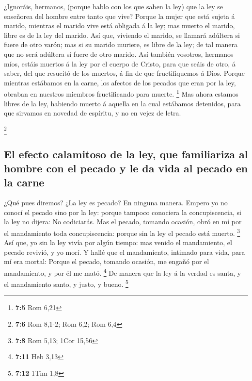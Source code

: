  ¿Ignoráis, hermanos, (porque hablo con los que saben la
ley) que la ley se enseñorea del hombre entre tanto que vive?
 Porque la mujer que está sujeta á marido, mientras el
marido vive está obligada á la ley; mas muerto el marido, libre es de la
ley del marido.  Así que, viviendo el marido, se llamará
adúltera si fuere de otro varón; mas si su marido muriere, es libre de
la ley; de tal manera que no será adúltera si fuere de otro marido.
 Así también vosotros, hermanos míos, estáis muertos á la
ley por el cuerpo de Cristo, para que seáis de otro, á saber, del que
resucitó de los muertos, á fin de que fructifiquemos á Dios.
 Porque mientras estábamos en la carne, los afectos de los
pecados que eran por la ley, obraban en nuestros miembros fructificando
para muerte. \footnote{\textbf{7:5} Rom 6,21}  Mas ahora
estamos libres de la ley, habiendo muerto á aquella en la cual estábamos
detenidos, para que sirvamos en novedad de espíritu, y no en vejez de
letra.

\footnote{\textbf{7:6} Rom 8,1-2; Rom 6,2; Rom 6,4}

\hypertarget{el-efecto-calamitoso-de-la-ley-que-familiariza-al-hombre-con-el-pecado-y-le-da-vida-al-pecado-en-la-carne}{%
\subsection{El efecto calamitoso de la ley, que familiariza al hombre
con el pecado y le da vida al pecado en la
carne}\label{el-efecto-calamitoso-de-la-ley-que-familiariza-al-hombre-con-el-pecado-y-le-da-vida-al-pecado-en-la-carne}}

 ¿Qué pues diremos? ¿La ley es pecado? En ninguna manera.
Empero yo no conocí el pecado sino por la ley: porque tampoco conociera
la concupiscencia, si la ley no dijera: No codiciarás. 
Mas el pecado, tomando ocasión, obró en mí por el mandamiento toda
concupiscencia: porque sin la ley el pecado está muerto. \footnote{\textbf{7:8}
  Rom 5,13; 1Cor 15,56}  Así que, yo sin la ley vivía por
algún tiempo: mas venido el mandamiento, el pecado revivió, y yo morí.
 Y hallé que el mandamiento, intimado para vida, para mí
era mortal:  Porque el pecado, tomando ocasión, me engañó
por el mandamiento, y por él me mató. \footnote{\textbf{7:11} Heb 3,13}
 De manera que la ley á la verdad es santa, y el
mandamiento santo, y justo, y bueno. \footnote{\textbf{7:12} 1Tim 1,8}

